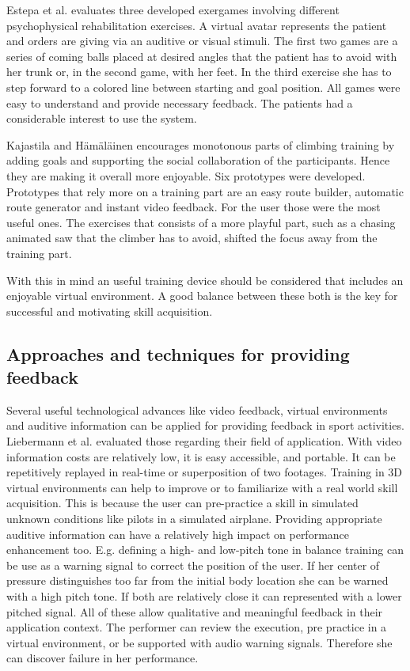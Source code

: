 Estepa et al. \cite{Estepa2016-oj} evaluates three developed exergames involving different psychophysical rehabilitation exercises. A virtual avatar represents the patient and orders are giving via an auditive or visual stimuli. The first two games are a series of coming balls placed at desired angles that the patient has to avoid with her trunk or, in the second game, with her feet. In the third exercise she has to step forward to a colored line between starting and goal position. All games were easy to understand and provide necessary feedback. The patients had a considerable interest to use the system.

Kajastila and Hämäläinen \cite{Kajastila2014-ug} encourages monotonous parts of climbing training by adding goals and supporting the social collaboration of the participants. Hence they are making it overall more enjoyable. Six prototypes were developed. Prototypes that rely more on a training part are an easy route builder, automatic route generator and instant video feedback. For the user those were the most useful ones. The exercises that consists of a more playful part, such as a chasing animated saw that the climber has to avoid, shifted the focus away from the training part. 

With this in mind an useful training device should be considered that includes an enjoyable virtual environment. A good balance between these both is the key for successful and motivating skill acquisition.

\subsection{Approaches and techniques for providing feedback}

Several  useful technological advances like video feedback, virtual environments and auditive information can be applied for providing feedback in sport activities. Liebermann et al. \cite{Liebermann2002-zr} evaluated those regarding their field of application. With video information costs are relatively low, it is easy accessible, and portable. It can be repetitively replayed in real-time or superposition of two footages. Training in 3D virtual environments can help to improve or to familiarize with a real world skill acquisition. This is because the user can pre-practice a skill in simulated unknown conditions like pilots in a simulated airplane. Providing appropriate auditive information can have a relatively high impact on performance enhancement too. E.g. defining a high- and low-pitch tone in balance training can be use as a warning signal to correct the position of the user. If her center of pressure distinguishes too far from the initial body location she can be warned with a high pitch tone. If both are relatively close it can represented with a lower pitched signal. All of these allow qualitative and meaningful feedback in their application context. The performer can review the execution, pre practice in a virtual environment, or be supported with audio warning signals. Therefore she can discover failure in her performance.

